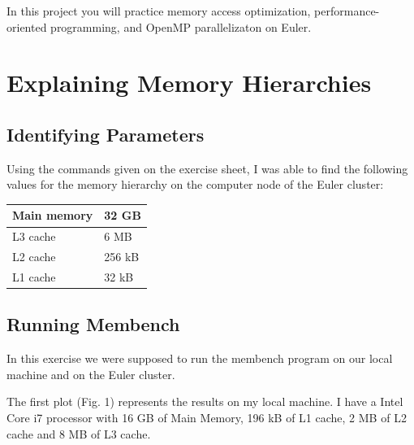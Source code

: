 \documentclass[unicode,11pt,a4paper,oneside,numbers=endperiod,openany]{scrartcl}
\begin{document}
\setassignment
{}

\newline

\assignmentpolicy
In this project you will practice memory access optimization, performance-oriented programming, and OpenMP parallelizaton 
on Euler.

\section{Explaining Memory Hierarchies }

\subsection{Identifying Parameters}
Using the commands given on the exercise sheet, I was able to find the following values for the memory hierarchy on the computer node of the Euler cluster:
\begin{center}
    \begin{tabular}{ |l|l| }
    \hline
    Main memory & 32 GB \\ \hline
    L3 cache & 6 MB \\ \hline
    L2 cache & 256 kB \\ \hline
    L1 cache & 32 kB \\
    \hline
    \end{tabular}
\end{center}

\subsection{Running Membench}
In this exercise we were supposed to run the membench program on our local machine and on the Euler cluster.

The first plot (Fig. 1) represents the results on my local machine. I have a Intel Core i7 processor with 16 GB of Main Memory, 196 kB of L1 cache, 2 MB of L2 cache and 8 MB of L3 cache.
\end{document}
